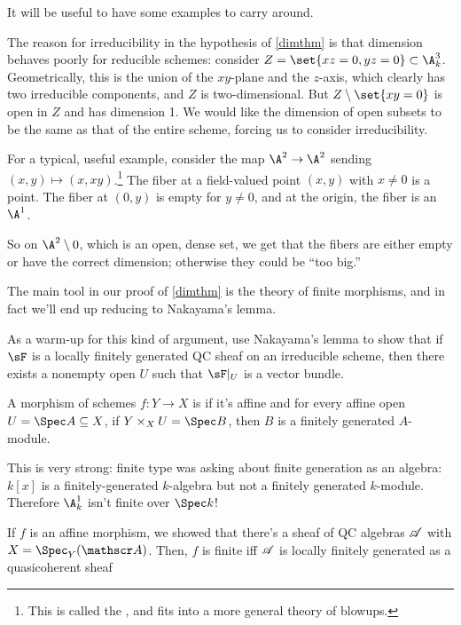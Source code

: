 It will be useful to have some examples to carry around.
\begin{exm}
The reason for irreducibility in the hypothesis of \cref{dimthm} is that dimension behaves poorly for reducible
schemes: consider $Z = \set{xz = 0, yz = 0}\subset\A_k^3$. Geometrically, this is the union of the $xy$-plane and
the $z$-axis, which clearly has two irreducible components, and $Z$ is two-dimensional. But $Z\setminus\set{xy =
0}$ is open in $Z$ and has dimension 1. We would like the dimension of open subsets to be the same as that of the
entire scheme, forcing us to consider irreducibility.
\end{exm}
\begin{exm}
For a typical, useful example, consider the map $\A^2\to\A^2$ sending $(x,y)\mapsto (x,xy)$.\footnote{This is
called the , and fits into a more general theory of blowups.} The fiber at a
field-valued point $(x,y)$ with $x\ne 0$ is a point. The fiber at $(0,y)$ is empty for $y\ne 0$, and at the origin,
the fiber is an $\A^1$.

So on $\A^2\setminus 0$, which is an open, dense set, we get that the fibers are either empty or have the correct
dimension; otherwise they could be ``too big.''
\end{exm}
The main tool in our proof of \cref{dimthm} is the theory of finite morphisms, and in fact we'll end up reducing to
Nakayama's lemma.
\begin{ex}
As a warm-up for this kind of argument, use Nakayama's lemma to show that if $\sF$ is a locally finitely generated
QC sheaf on an irreducible scheme, then there exists a nonempty open $U$ such that $\sF|_U$ is a vector bundle.
\end{ex}
\begin{defn}
A morphism of schemes $f\colon Y\to X$ is  if it's affine and for every affine open $U = \Spec
A\subseteq X$, if $Y\times_X U = \Spec B$, then $B$ is a finitely generated $A$-module.
\end{defn}
This is very strong: finite type was asking about finite generation as an algebra: $k[x]$ is a finitely-generated
$k$-algebra but not a finitely generated $k$-module. Therefore $\A^1_k$ isn't finite over $\Spec k$!
\begin{rem}
If $f$ is an affine morphism, we showed that there's a sheaf of QC algebras $\mathscr A$ with $X = \Spec_Y(\sA)$. Then,
$f$ is finite iff $\mathscr A$ is locally finitely generated as a quasicoherent sheaf
\end{rem}
